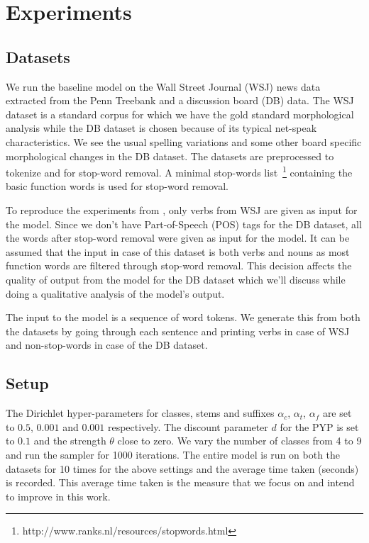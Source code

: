 \documentclass{article}
\begin{document}
\section{Experiments}
\label{sec:experiments}


\subsection{Datasets}

We run the baseline model on the Wall Street Journal (WSJ) news data extracted from the Penn Treebank
and a discussion board (DB) data. The WSJ dataset is a standard corpus 
for which we have the gold standard morphological analysis while the DB dataset 
is chosen because of its typical net-speak characteristics. We see 
the usual spelling variations and some other board specific morphological
 changes in the DB dataset. The datasets are preprocessed to tokenize 
and for stop-word removal. A minimal stop-words 
list~\footnote{http://www.ranks.nl/resources/stopwords.html} containing 
the basic function words is used for stop-word removal.

To reproduce the experiments from \cite{goldwater2011}, only verbs from WSJ 
are given as input for the model. Since we don't have Part-of-Speech (POS)
 tags for the DB dataset, all the words after stop-word removal were 
given as input for the model. It can be assumed that the input in case of 
this dataset is both verbs and nouns as most function words are filtered 
through stop-word removal. This decision affects the quality of output 
from the model for the DB dataset which we'll discuss while doing a 
qualitative analysis of the model's output.

The input to the model is a sequence of word tokens. We generate this 
from both the datasets by going through each sentence and printing verbs 
in case of WSJ and non-stop-words in case of the DB dataset.

\subsection{Setup}

The Dirichlet hyper-parameters for classes, stems and suffixes 
$\alpha_{c}$, $\alpha_{t}$, $\alpha_{f}$ are set to 
$0.5$, $0.001$ and $0.001$ respectively. The discount parameter $d$ for the PYP is set 
to $0.1$ and the strength $\theta$ close to zero.
We vary the number of classes from 4 to 9 and run the sampler for 1000 
iterations. The entire model is run on both the datasets for 10 times 
for the above settings and the average time taken (seconds) is recorded.
This average time taken is the measure that we focus on and intend to 
improve in this work.
\end{document}
